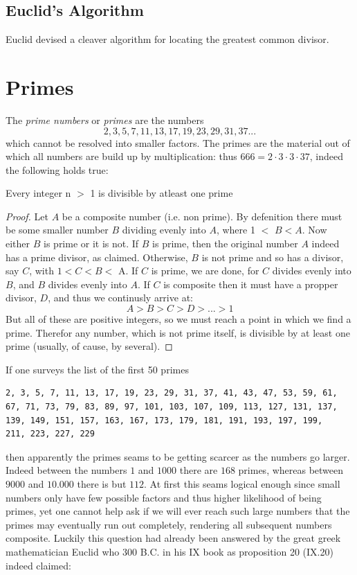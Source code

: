 \subsection{Euclid's Algorithm}
Euclid devised a cleaver algorithm for locating the greatest common divisor. 



\section{Primes}
The \textit{prime numbers} or \textit{primes} are the numbers
\[2,3 , 5, 7, 11, 13, 17, 19, 23, 29, 31, 37 ...\]
which cannot be resolved into smaller factors. The primes are the material out of which
all numbers are build up by multiplication: thus $666 = 2 \cdot 3 \cdot 3 \cdot 37$, indeed the following holds true:

\begin{prop}\label{prim_div}
Every integer n $>$ 1 is divisible by atleast one prime
\end{prop}
\begin{proof} 
Let $A$ be a composite number (i.e. non prime). By defenition there must be some smaller number $B$ dividing evenly into $A$, where 1 $<$
$B < A$. Now either $B$ is prime or it is not. If $B$ is prime, then the original number $A$ indeed has a prime divisor, as claimed. Otherwise, $B$ is not
prime and so has a divisor, say $C$, with $1 < C < B <$ A. If $C$ is prime, we are done, for $C$ divides evenly into $B$, and $B$ divides evenly into $A$.
If $C$ is composite then it must have a propper divisor, $D$, and thus we continusly arrive at:
\[
A > B > C > D > ... > 1
\]
But all of these are positive integers, so we must reach a point in which we find a prime. Therefor any number, which is not prime itself, is divisible
by at least one prime (usually, of cause, by several).
\end{proof}

If one surveys the list of the first 50 primes
\begin{lstlisting}
2, 3, 5, 7, 11, 13, 17, 19, 23, 29, 31, 37, 41, 43, 47, 53, 59, 61, 
67, 71, 73, 79, 83, 89, 97, 101, 103, 107, 109, 113, 127, 131, 137, 
139, 149, 151, 157, 163, 167, 173, 179, 181, 191, 193, 197, 199, 
211, 223, 227, 229
\end{lstlisting}

then apparently the primes seams to be getting scarcer as the numbers go larger. Indeed between the numbers $1$ and $1000$ there are $168$ primes, whereas between $9000$ and $10.000$ there is but $112$. At first this seams logical enough since small numbers only have few possible factors and thus higher likelihood of being primes, yet one cannot help ask if we will ever reach such large numbers that the primes may eventually run out completely, rendering all subsequent numbers composite. Luckily this question had already been answered by the great greek mathematician Euclid who 300 B.C. in his IX book as proposition 20 (IX.20) indeed claimed:

